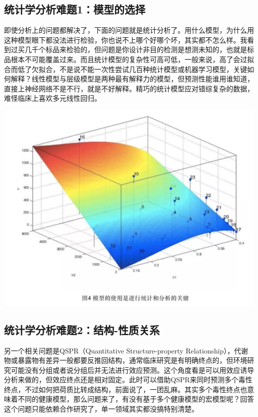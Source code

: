 \documentclass[
]{book}
\begin{document}
\hypertarget{ux7edfux8ba1ux5b66ux5206ux6790ux96beux98981ux6a21ux578bux7684ux9009ux62e9}{%
\subsection{统计学分析难题1：模型的选择}\label{ux7edfux8ba1ux5b66ux5206ux6790ux96beux98981ux6a21ux578bux7684ux9009ux62e9}}

即使分析上的问题都解决了，下面的问题就是统计分析了。用什么模型，为什么用这种模型眼下都没法进行检验，你也说不上哪个好哪个坏，其实都不怎么样。我看到过买几千个标品来检验的，但问题是你设计非目的检测是想测未知的，也就是标品根本不可能覆盖过来。而且统计模型的复杂性可高可低，一般来说，高了会过拟合而低了欠拟合，不是说不能一次性尝试几百种统计模型或机器学习模型，关键如何解释？线性模型与层级模型是两种最有解释力的模型，但预测性能谁用谁知道，直接上神经网络不是不行，就是不好解释。精巧的统计模型应对错综复杂的数据，难怪临床上喜欢多元线性回归。

\includegraphics[width=6.67in]{images/expo4}

\hypertarget{ux7edfux8ba1ux5b66ux5206ux6790ux96beux98982ux7ed3ux6784-ux6027ux8d28ux5173ux7cfb}{%
\subsection{统计学分析难题2：结构-性质关系}\label{ux7edfux8ba1ux5b66ux5206ux6790ux96beux98982ux7ed3ux6784-ux6027ux8d28ux5173ux7cfb}}

另一个相关问题是QSPR（Quantitative Structure-property Relationship），代谢物或暴露物有差异一般都要反推回结构，通常临床研究是有明确终点的，但环境研究可能没有分组或者说分组后并无法进行效应预测。这个角度看是可以用效应诱导分析来做的，但效应终点还是相对固定。此时可以借助QSPR来同时预测多个毒性终点，不过如何把荷质比转成结构，前面说了，一团乱麻。其实多个毒性终点也意味着不同的健康模型，那么问题来了，有没有基于多个健康模型的宏模型呢？回答这个问题只能依赖合作研究了，单一领域其实都没搞特别清楚。
\end{document}
